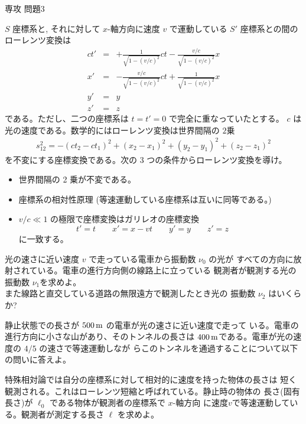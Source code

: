 \documentclass[fleqn]{jbook}
\begin{document}
\begin{question}{専攻 問題3}{}


\begin{subquestions}
\SubQuestion
  $S$ 座標系と, それに対して $x$-軸方向に速度 $v$ で運動している 
  $S'$ 座標系との間のローレンツ変換は
%
  \begin{eqnarray*}
    ct' &=& +\frac{1}{\sqrt{1 - (v/c)^2}} ct 
            -\frac{v/c}{\sqrt{1 - (v/c)^2}} x \\[-1mm]
    x'  &=& -\frac{v/c}{\sqrt{1 - (v/c)^2}} ct 
            +\frac{1}{\sqrt{1 - (v/c)^2}} x  \\[1mm]
    y'  &=& y \\[2mm]
    z'  &=& z  
  \end{eqnarray*}
%
  である。ただし、二つの座標系は $t=t'=0$ で完全に重なっていたとする。
  $c$ は光の速度である。数学的にはローレンツ変換は世界間隔の $2$乗
%
  \begin{eqnarray*}
     s_{12}^2 = - (ct_2 - ct_1)^2 + (x_2 - x_1)^2%
            + (y_2 - y_1)^2 + (z_2 - z_1)^2
  \end{eqnarray*}
%
  を不変にする座標変換である。次の 3 つの条件からローレンツ変換を導け。

  \begin{itemize}
  \item 世界間隔の 2 乗が不変である。
  \item 座標系の相対性原理 (等速運動している座標系は互いに同等である。)
  \item $v/c \ll 1$ の極限で座標変換はガリレオの座標変換
    \[ t' = t \qquad%
       x' = x - vt \qquad%
       y' = y \qquad%
       z' = z \qquad \]
    に一致する。
  \end{itemize}



\SubQuestion
  光の速さに近い速度 $v$ で走っている電車から振動数 ${\nu}_0$ の光が
  すべての方向に放射されている。電車の進行方向側の線路上に立っている
  観測者が観測する光の振動数 ${\nu}_1$を求めよ。 \\
  また線路と直交している道路の無限遠方で観測したとき光の
  振動数 ${\nu}_2$ はいくらか?


\SubQuestion
  静止状態での長さが $500\,{\rm m}$ の電車が光の速さに近い速度で走って
  いる。電車の進行方向に小さな山があり、そのトンネルの長さは
  $400\,{\rm m}$である。電車が光の速度の $4/5$ の速さで等速運動しなが
  らこのトンネルを通過することについて以下の問いに答えよ。

  \begin{subsubquestions}
  \SubSubQuestion
    特殊相対論では自分の座標系に対して相対的に速度を持った物体の長さは
    短く観測される。これはローレンツ短縮と呼ばれている。静止時の物体の
    長さ(固有長さ)が $\ell_0$ である物体が観測者の座標系で $x$-軸方向
    に速度$v$で等速運動している。観測者が測定する長さ $\ell$ を求めよ。


\end{subsubquestions}
\end{subquestions}
\end{question}
\end{document}
